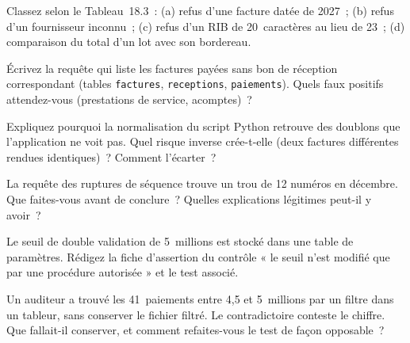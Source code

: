\bigskip

\begin{boxexo}[title={\ding{45}\quad Exercice~18.4. Les types de contrôles \niveaubase}]
Classez selon le Tableau~18.3~: (a) refus d'une facture datée de 2027~;
(b) refus d'un fournisseur inconnu~; (c) refus d'un RIB de 20~caractères au
lieu de 23~; (d) comparaison du total d'un lot avec son bordereau.
\end{boxexo}

\begin{boxexo}[title={\ding{45}\quad Exercice~18.5. Une requête à écrire \niveaumoyen}]
Écrivez la requête qui liste les factures payées sans bon de réception
correspondant (tables \texttt{factures}, \texttt{receptions},
\texttt{paiements}). Quels faux positifs attendez-vous (prestations de
service, acomptes)~?
\end{boxexo}

\begin{boxexo}[title={\ding{45}\quad Exercice~18.6. Normaliser \niveaumoyen}]
Expliquez pourquoi la normalisation du script Python retrouve des doublons
que l'application ne voit pas. Quel risque inverse crée-t-elle (deux
factures différentes rendues identiques)~? Comment l'écarter~?
\end{boxexo}

\begin{boxexo}[title={\ding{45}\quad Exercice~18.7. La séquence \niveaumoyen}]
La requête des ruptures de séquence trouve un trou de 12 numéros en
décembre. Que faites-vous avant de conclure~? Quelles explications
légitimes peut-il y avoir~?
\end{boxexo}

\begin{boxexo}[title={\ding{45}\quad Exercice~18.8. Les paramètres \niveaumoyen}]
Le seuil de double validation de 5~millions est stocké dans une table de
paramètres. Rédigez la fiche d'assertion du contrôle « le seuil n'est
modifié que par une procédure autorisée » et le test associé.
\end{boxexo}

\begin{boxexo}[title={\ding{45}\quad Exercice~18.9. Reproductibilité \niveauexpert}]
Un auditeur a trouvé les 41~paiements entre 4,5 et 5~millions par un
filtre dans un tableur, sans conserver le fichier filtré. Le contradictoire
conteste le chiffre. Que fallait-il conserver, et comment refaites-vous le
test de façon opposable~?
\end{boxexo}

